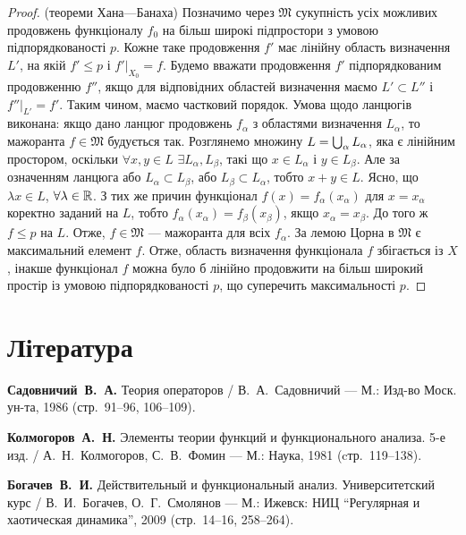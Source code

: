 \begin{proof}(теореми Хана---Банаха)
Позначимо через $\mathfrak{M}$ сукупність усіх можливих
продовжень функціоналу $f_0$ на більш широкі підпростори з
умовою підпорядкованості $p$. Кожне таке продовження $f'$
має лінійну область визначення $L'$, на якій $f' \le p$ і
$f'|_{X_0} = f$. Будемо вважати продовження $f'$ підпорядкованим
продовженню $f''$, якщо для відповідних областей визначення
маємо $L' \subset L''$ і $f''|_{L'} = f'$. Таким чином, маємо частковий
порядок. Умова щодо ланцюгів виконана: якщо дано ланцюг
продовжень $f_\alpha$ з областями визначення $L_\alpha$, то мажоранта
$f \in \mathfrak{M}$ будується так.
Розглянемо множину $L = \operatorname*{\bigcup}_\alpha L_\alpha$, яка є
лінійним простором, оскільки $\forall x, y \in L$ $\exists L_\alpha, L_\beta$, такі що
$x \in L_\alpha$ і $y \in L_\beta$.
Але за означенням ланцюга або $L_\alpha \subset L_\beta$, або
$L_\beta \subset L_\alpha$, тобто $x + y \in L$.
Ясно, що $\lambda x \in L$, $\forall \lambda \in \mathbb{R}$. З тих же
причин функціонал $f(x) = f_\alpha(x_\alpha)$ для $x = x_\alpha$ коректно
заданий на $L$, тобто $f_\alpha(x_\alpha) = f_\beta(x_\beta)$,
якщо $x_\alpha = x_\beta$. До того ж
$f \le p$ на $L$. Отже, $f \in \mathfrak{M}$ --- мажоранта для всіх $f_\alpha$. За
лемою Цорна в $\mathfrak{M}$ є максимальний елемент $f$. Отже,
область визначення функціонала $f$ збігається із $X$, інакше
функціонал $f$ можна було б лінійно продовжити на більш
широкий простір із умовою підпорядкованості $p$, що
суперечить максимальності $p$.
\end{proof}


\section{Література}

\begin{enumerate}[label={[\arabic*]}]
\item \textbf{Садовничий~В.~А.}
Теория операторов /
В.~А.~Садовничий ---
М.: Изд-во Моск. ун-та, 1986 (стр.~91--96, 106--109).
\item \textbf{Колмогоров~А.~Н.}
Элементы теории функций и функционального анализа. 5-е изд. /
А.~Н.~Колмогоров, С.~В.~Фомин ---
М.: Наука, 1981 (cтр.~119--138).
\item \textbf{Богачев~В.~И.}
Действительный и функциональный анализ. Университетский курс /
В.~И.~Богачев, О.~Г.~Смолянов ---
М.: Ижевск: НИЦ ``Регулярная и хаотическая динамика'', 2009 (стр.~14--16, 258--264).
\end{enumerate}
